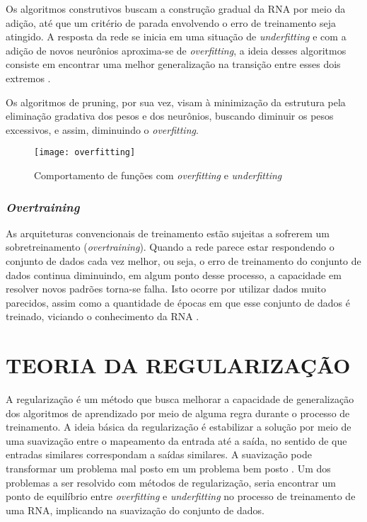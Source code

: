 Os algoritmos construtivos buscam a construção gradual da RNA por meio da adição, até que um critério de parada envolvendo o erro de treinamento seja atingido. A resposta da rede se inicia em uma situação de \textit{underfitting} e com a adição de novos neurônios aproxima-se de \textit{overfitting}, a ideia desses algoritmos consiste em encontrar uma melhor generalização na transição entre esses dois extremos \cite{medeiros}.

Os algoritmos de pruning, por sua vez, visam à minimização da estrutura pela eliminação gradativa dos pesos e dos neurônios, buscando diminuir os pesos excessivos, e assim, diminuindo o \textit{overfitting}.

\begin{figure}[h]
	\centering
	\texttt{[image: overfitting]}
	\caption{Comportamento de funções com \textit{overfitting} e \textit{underfitting}}
	\label{overfittin-fig}
\end{figure}

\subsubsection{\textit{Overtraining}}
As arquiteturas convencionais de treinamento estão sujeitas a sofrerem um sobretreinamento (\textit{overtraining}). Quando a rede parece estar respondendo o conjunto de dados cada vez melhor, ou seja, o erro de treinamento do conjunto de dados continua diminuindo, em algum ponto desse processo, a capacidade em resolver novos padrões torna-se falha. Isto ocorre por utilizar dados muito parecidos, assim como a quantidade de épocas em que esse conjunto de dados é treinado, viciando o conhecimento da RNA \cite{haykin2000}.

\section{TEORIA DA REGULARIZAÇÃO}\label{regularizacao}
A regularização é um método que busca melhorar a capacidade de generalização dos algoritmos de aprendizado por meio de alguma regra durante o processo de treinamento. A ideia básica da regularização é estabilizar a solução por meio de uma suavização entre o mapeamento da entrada até a saída, no sentido de que entradas similares correspondam a saídas similares. A suavização pode transformar um problema mal posto em um problema bem posto \cite{medeiros}. Um dos problemas a ser resolvido com métodos de regularização, seria encontrar um ponto de equilíbrio entre \textit{overfitting} e \textit{underfitting} no processo de treinamento de uma RNA, implicando na suavização do conjunto de dados.


